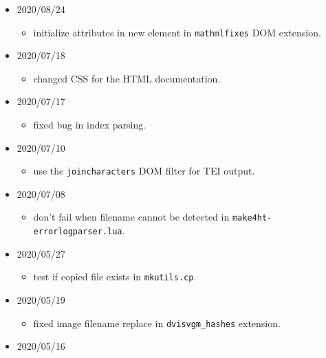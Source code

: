 \begin{itemize}
  \begin{itemize}
  \tightlist
  \item
    \texttt{fixinlines} DOM filter: added
    \texttt{\textless{}a\textgreater{}} element into list of inline
    elements.
  \end{itemize}
\item
  2020/08/24

  \begin{itemize}
  \tightlist
  \item
    initialize attributes in new element in \texttt{mathmlfixes} DOM
    extension.
  \end{itemize}
\item
  2020/07/18

  \begin{itemize}
  \tightlist
  \item
    changed CSS for the HTML documentation.
  \end{itemize}
\item
  2020/07/17

  \begin{itemize}
  \tightlist
  \item
    fixed bug in index parsing.
  \end{itemize}
\item
  2020/07/10

  \begin{itemize}
  \tightlist
  \item
    use the \texttt{joincharacters} DOM filter for TEI output.
  \end{itemize}
\item
  2020/07/08

  \begin{itemize}
  \tightlist
  \item
    don't fail when filename cannot be detected in
    \texttt{make4ht-errorlogparser.lua}.
  \end{itemize}
\item
  2020/05/27

  \begin{itemize}
  \tightlist
  \item
    test if copied file exists in \texttt{mkutils.cp}.
  \end{itemize}
\item
  2020/05/19

  \begin{itemize}
  \tightlist
  \item
    fixed image filename replace in \texttt{dvisvgm\_hashes} extension.
  \end{itemize}
\item
  2020/05/16


\end{itemize}
